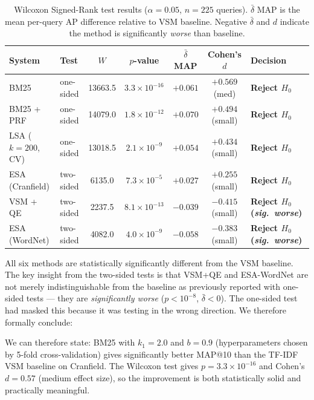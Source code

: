 \documentclass{svproc}
\begin{document}
    \begin{table}[H]
    \centering
    \renewcommand{\arraystretch}{1.3}
    \begin{tabular}{llccccl}
    \toprule
    \textbf{System} & \textbf{Test} & \textbf{$W$} & \textbf{$p$-value} & \textbf{$\bar{\delta}$ MAP} & \textbf{Cohen's $d$} & \textbf{Decision} \\
    \midrule
    BM25           & one-sided & 13663.5 & $3.3 \times 10^{-16}$ & $+0.061$ & $+0.569$ (med) & \textbf{Reject $H_0$} \\
    BM25 + PRF     & one-sided & 14079.0 & $1.8 \times 10^{-12}$ & $+0.070$ & $+0.494$ (small) & \textbf{Reject $H_0$} \\
    LSA ($k{=}200$, CV) & one-sided & 13018.5 & $2.1 \times 10^{-9}$  & $+0.054$ & $+0.434$ (small) & \textbf{Reject $H_0$} \\
    ESA (Cranfield)& two-sided & 6135.0  & $7.3 \times 10^{-5}$  & $+0.027$ & $+0.255$ (small) & \textbf{Reject $H_0$} \\
    VSM + QE       & two-sided & 2237.5  & $8.1 \times 10^{-13}$ & $-0.039$ & $-0.415$ (small) & \textbf{Reject $H_0$ (\emph{sig.\ worse})} \\
    ESA (WordNet)  & two-sided & 4082.0  & $4.0 \times 10^{-9}$  & $-0.058$ & $-0.383$ (small) & \textbf{Reject $H_0$ (\emph{sig.\ worse})} \\
    \bottomrule
    \end{tabular}
    \caption{Wilcoxon Signed-Rank test results ($\alpha = 0.05$, $n{=}225$ queries). $\bar{\delta}$ MAP is the mean per-query AP difference relative to VSM baseline. Negative $\bar{\delta}$ and $d$ indicate the method is significantly \emph{worse} than baseline.}
    \label{tab:wilcoxon}
    \end{table}

    All six methods are statistically significantly different from the VSM baseline. The key insight from the two-sided tests is that VSM+QE and ESA-WordNet are not merely indistinguishable from the baseline as previously reported with one-sided tests --- they are \emph{significantly worse} ($p < 10^{-8}$, $\bar{\delta} < 0$). The one-sided test had masked this because it was testing in the wrong direction. We therefore formally conclude:

    We can therefore state: BM25 with $k_1{=}2.0$ and $b{=}0.9$ (hyperparameters chosen by 5-fold cross-validation) gives significantly better MAP@10 than the TF-IDF VSM baseline on Cranfield. The Wilcoxon test gives $p = 3.3 \times 10^{-16}$ and Cohen's $d = 0.57$ (medium effect size), so the improvement is both statistically solid and practically meaningful.
\end{document}

